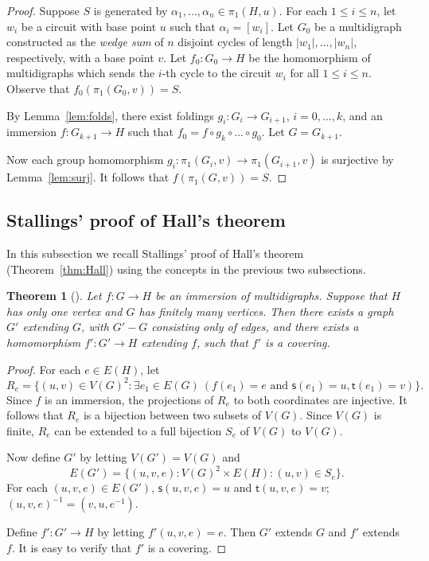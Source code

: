 \documentclass[11pt]{amsart}
\newtheorem{theorem}{Theorem}[section]
\theoremstyle{definition}
\theoremstyle{definition}
\numberwithin{equation}{section}
\begin{document}
\begin{proof} Suppose $S$ is generated by $\alpha_1, \dots, \alpha_n\in \pi_1(H, u)$. For each $1\leq i\leq n$, let $w_i$ be a circuit with base point $u$ such that $\alpha_i=[w_i]$. Let $G_0$ be a multidigraph constructed as the {\em wedge sum} of $n$ disjoint cycles of length $|w_1|, \dots, |w_n|$, respectively, with a base point $v$. Let $f_0\colon G_0\to H$ be the homomorphism of multidigraphs which sends the $i$-th cycle to the circuit $w_i$ for all $1\leq i\leq n$. Observe that $f_0(\pi_1(G_0, v))=S$. 

By Lemma~\ref{lem:folds}, there exist foldings $g_i\colon G_i\to G_{i+1}$, $i=0,\dots, k$, and an immersion $f\colon G_{k+1}\to H$ such that $f_0=f\circ g_k\circ \dots \circ g_0$. Let $G=G_{k+1}$. 

Now each group homomorphism $g_i\colon \pi_1(G_i, v)\to \pi_1(G_{i+1}, v)$ is surjective by Lemma~\ref{lem:surj}. It follows that $f(\pi_1(G, v))=S$. 
\end{proof}



\subsection{Stallings' proof of Hall's theorem\label{subsec:Stallings}}
In this subsection we recall Stallings' proof of Hall's theorem (Theorem~\ref{thm:Hall}) using the concepts in the previous two subsections.

\begin{theorem}[{\cite[Theorem 6.1]{St83}}] \label{thm:immersion2covering} Let $f\colon G\to H$ be an immersion of multidigraphs. Suppose that $H$ has only one vertex and $G$ has finitely many vertices. Then there exists a graph $G'$ extending $G$, with $G'-G$ consisting only of edges, and there exists a homomorphism $f'\colon G'\to H$ extending $f$, such that $f'$ is a covering. 
\end{theorem}

\begin{proof} For each $e\in E(H)$, let
$$ R_e=\{(u, v)\in V(G)^2\colon \exists e_1\in E(G)\ (f(e_1)=e\mbox{ and } \mathsf{s}(e_1)=u, \mathsf{t}(e_1)=v)\}. $$
Since $f$ is an immersion, the projections of $R_e$ to both coordinates are injective. It follows that $R_e$ is a bijection between two subsets of $V(G)$. Since $V(G)$ is finite, $R_e$ can be extended to a full bijection $S_e$ of $V(G)$ to $V(G)$.

Now define $G'$ by letting $V(G')=V(G)$ and 
$$ E(G')=\{(u,v, e)\colon V(G)^2\times E(H)\colon (u, v)\in S_e\}. $$
For each $(u,v, e)\in E(G')$, $\mathsf{s}(u,v,e)=u$ and $\mathsf{t}(u,v,e)=v$; $(u,v,e)^{-1}=(v,u,e^{-1})$.

Define $f'\colon G'\to H$ by letting $f'(u,v,e)=e$. Then $G'$ extends $G$ and $f'$ extends $f$. It is easy to verify that $f'$ is a covering.
\end{proof}
\end{document}
